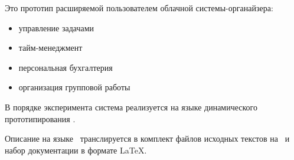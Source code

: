 
Это прототип расширяемой пользователем облачной системы-органайзера: 

\begin{itemize}[nosep]
\item управление задачами 
\item тайм-менеджмент
\item персональная бухгалтерия
\item организация групповой работы
\end{itemize}


В порядке эксперимента система реализуется на языке динамического
прототипирования \bi.

Описание на языке \bi\ транслируется в комплект файлов исходных текстов на 
\cpp\ и набор документации в формате \LaTeX.
